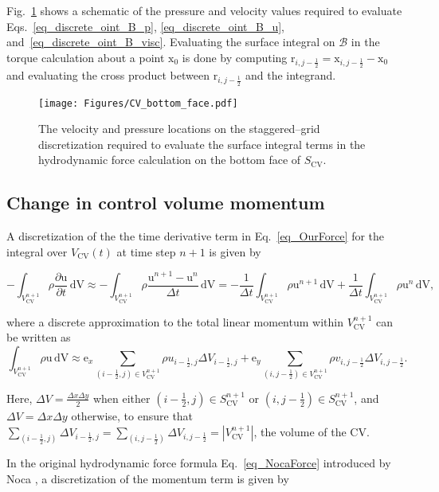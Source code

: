\documentclass[review]{elsarticle}
\newcommand \D [2]{\frac{\partial #1}{\partial #2}}
\renewcommand{\vec}[1]{\bm{\mathrm{#1}}}
\def \x{\vec{x}}
\def \r{\vec{r}}
\def \u{\vec{u}}
\def \e{\vec{e}}
\def  \Scv{S_\text{CV}}
\def  \Vcv{V_\text{CV}}
\def  \Vcvt{V_\text{CV}(t)}
\def \cB{\mathcal{B}}
\def \e{\vec{e}}
\def \half{\frac{1}{2}}
\def \u{\vec{u}}
\def \x{\vec{x}}
\def \dt{\Delta t}
\def \dx{\Delta x}
\def \dy{\Delta y}
\def \delV{\Delta V}
\def \dV{\,\mathrm{dV}}
\def \dt{\Delta t}
\def \dx{\Delta x}
\begin{document}
\noindent Fig.~\ref{fig_CV_bottom_face} shows a schematic of the pressure
and velocity values required to evaluate Eqs.~\eqref{eq_discrete_oint_B_p},
\eqref{eq_discrete_oint_B_u}, and~\eqref{eq_discrete_oint_B_visc}.
Evaluating the surface integral on $\cB$ in the torque calculation about a point
$\x_0$ is done by computing $\r_{i,j-\half} = \x_{i,j-\half} - \x_0$ and evaluating
the cross product between $\r_{i,j-\half}$ and the integrand.


\begin{figure}[H]
  \centering
    \texttt{[image: Figures/CV\_bottom\_face.pdf]}
  \caption{
  The velocity and pressure locations on the staggered--grid
  discretization required to evaluate the surface integral terms
  in the hydrodynamic force calculation on the bottom face of $\Scv$.}
  \label{fig_CV_bottom_face}
\end{figure}

\subsection{Change in control volume momentum}
A discretization of the the time derivative term in Eq.~\eqref{eq_OurForce}
for the integral over $\Vcvt$ at time step $n+1$ is given by


\begin{equation}
\label{eq_temporal_discrete_CV_momentum}
-\int_{\Vcv^{n+1}} \rho \D{\u}{t} \dV  \approx 
-\int_{\Vcv^{n+1}} \rho \frac{\u^{n+1} - \u^{n}}{\dt} \dV
= -\frac{1}{\dt}\int_{\Vcv^{n+1}} \rho \u^{n+1} \dV + \frac{1}{\dt}\int_{\Vcv^{n+1}} \rho \u^{n} \dV,
\end{equation}

\noindent where a discrete approximation to the total linear momentum within $\Vcv^{n+1}$ can
be written as
\begin{equation}
\label{eq_discrete_CV_momentum}
\int_{\Vcv^{n+1}} \rho \u \dV \approx 
 \e_x \sum_{(i-\half,j) \in \Vcv^{n+1}} \rho u_{i-\half,j} \delV_{i-\half,j}
+ \e_y \sum_{(i,j-\half) \in \Vcv^{n+1}} \rho v_{i,j-\half} \delV_{i,j-\half}.
\end{equation}

\noindent Here, $\delV = \frac{\dx\dy}{2}$ when either $(i-\half,j) \in \Scv^{n+1}$ or
$(i,j-\half) \in \Scv^{n+1}$, and $\delV = \dx\dy$ otherwise, to ensure that 
$\sum_{(i-\half,j)} \delV_{i-\half,j} = \sum_{(i,j-\half)} \delV_{i,j-\half} = \left|\Vcv^{n+1}\right|$, the
volume of the CV. 

In the original hydrodynamic force formula Eq.~\eqref{eq_NocaForce} 
introduced by Noca \cite{Noca97}, a discretization of the momentum
term is given by
\end{document}
